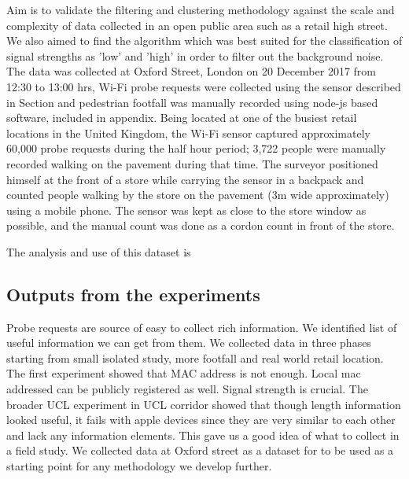 Aim is to validate the filtering and clustering methodology against the scale and complexity of data collected in an open public area such as a retail high street.
We also aimed to find the algorithm which was best suited for the classification of signal strengths as 'low' and 'high' in order to filter out the background noise.
The data was collected at Oxford Street, London on 20 December 2017 from 12:30 to 13:00 hrs, Wi-Fi probe requests were collected using the sensor described in Section and pedestrian footfall was manually recorded using node-js based software, included in appendix.
Being located at one of the busiest retail locations in the United Kingdom, the Wi-Fi sensor captured approximately 60,000 probe requests during the half hour period; 3,722 people were manually recorded walking on the pavement during that time.
The surveyor positioned himself at the front of a store while carrying the sensor in a backpack and counted people walking by the store on the pavement (3m wide approximately) using a mobile phone.
The sensor was kept as close to the store window as possible, and the manual count was done as a cordon count in front of the store.

The analysis and use of this dataset is 

\subsection{Outputs from the experiments}

Probe requests are source of easy to collect rich information.
We identified list of useful information we can get from them.
We collected data in three phases starting from small isolated study, more footfall and real world retail location.
The first experiment showed that MAC address is not enough. Local mac addressed can be publicly registered as well.
Signal strength is crucial.
The broader UCL experiment in UCL corridor showed that though length information looked useful, it fails with apple devices since they are very similar to each other and lack any information elements. 
This gave us a good idea of what to collect in a field study. 
We collected data at Oxford street as a dataset for to be used as a starting point for any methodology we develop further.

